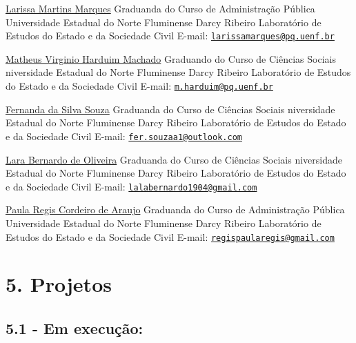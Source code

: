 \documentclass[
  12pt,
]{report}
\begin{document}
\href{http://lattes.cnpq.br/8424422005329610}{Larissa Martins Marques}
\hfill\break Graduanda do Curso de Administração Pública \hfill\break
Universidade Estadual do Norte Fluminense Darcy Ribeiro \hfill\break
Laboratório de Estudos do Estado e da Sociedade Civil \hfill\break
E-mail:
\href{mailto:larissamarques@pq.uenf.br}{\nolinkurl{larissamarques@pq.uenf.br}}
\hfill\break

\href{http://lattes.cnpq.br/6781198318316057}{Matheus Virginio Harduim
Machado} \hfill\break Graduando do Curso de Ciências Sociais
\hfill\break niversidade Estadual do Norte Fluminense Darcy Ribeiro
\hfill\break Laboratório de Estudos do Estado e da Sociedade Civil
\hfill\break E-mail:
\href{mailto:m.harduim@pq.uenf.br}{\nolinkurl{m.harduim@pq.uenf.br}}
\hfill\break

\href{http://lattes.cnpq.br/7181203038300743}{Fernanda da Silva Souza}
\hfill\break Graduanda do Curso de Ciências Sociais \hfill\break
niversidade Estadual do Norte Fluminense Darcy Ribeiro \hfill\break
Laboratório de Estudos do Estado e da Sociedade Civil \hfill\break
E-mail:
\href{mailto:fer.souzaa1@outlook.com}{\nolinkurl{fer.souzaa1@outlook.com}}
\hfill\break

\href{http://lattes.cnpq.br/6943283489647623}{Lara Bernardo de Oliveira}
\hfill\break Graduanda do Curso de Ciências Sociais \hfill\break 
niversidade Estadual do Norte Fluminense Darcy Ribeiro \hfill\break
Laboratório de Estudos do Estado e da Sociedade Civil \hfill\break
E-mail:
\href{mailto:lalabernardo1904@gmail.com}{\nolinkurl{lalabernardo1904@gmail.com}}
\hfill\break

\href{http://lattes.cnpq.br/5081047341028478}{Paula Regis Cordeiro de
Araujo} \hfill\break Graduanda do Curso de Administração Pública
\hfill\break Universidade Estadual do Norte Fluminense Darcy Ribeiro
\hfill\break Laboratório de Estudos do Estado e da Sociedade Civil
\hfill\break E-mail:
\href{mailto:regispaularegis@gmail.com}{\nolinkurl{regispaularegis@gmail.com}}
\hfill\break

\hypertarget{projetos}{%
\section{5. Projetos}\label{projetos}}

\hypertarget{em-execuuxe7uxe3o}{%
\subsection{5.1 - Em execução:}\label{em-execuuxe7uxe3o}}
\end{document}
